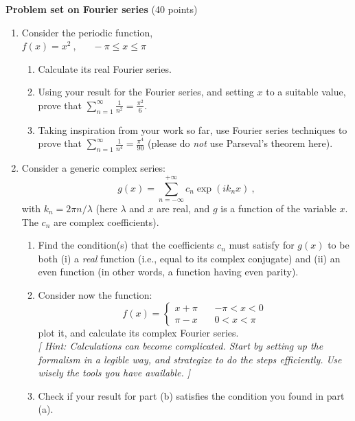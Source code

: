 \documentclass[fleqn]{article}
\begin{document}
\textbf{Problem set on Fourier series} (40 points)
\begin{enumerate}
  \item Consider the periodic function, \\$f(x)=x^2~,~~~~~~~ -\pi \leq x \leq \pi$
    \begin{enumerate}
    \item Calculate its real Fourier series.
    \item Using your result for the Fourier series, and setting $x$ to a suitable value, prove that $\sum^{\infty}_{n=1}\frac{1}{n^2}=\frac{\pi^2}{6}$. 
    \item Taking inspiration from your work so far, use Fourier series techniques to prove that $\sum^{\infty}_{n=1}\frac{1}{n^4}=\frac{\pi^4}{90}$ (please do \emph{not} use Parseval's theorem here). 

    \end{enumerate}

  \item Consider a generic complex series: $$g(x)=\sum_{n=-\infty}^{+ \infty} c_n \exp({ i k_n x})~,$$ with $k_n=2 \pi n/\lambda$ (here $\lambda$ and $x$ are real, and $g$ is a function of the variable $x$. The $c_n$ are complex coefficients).
      \begin{enumerate}
        \item Find the condition(s) that the coefficients $c_n$ must satisfy for $g(x)$ to be both (i)  a {\it real} function (i.e., equal to its complex conjugate) and (ii) an even function (in other words, a function having even parity).  
        \item Consider now the function:
        \begin{equation}
          f\left( x\right) =\left\{ 
          \begin{array}{rrr}
          x+ \pi  & \, & - \pi <x<0 \\ 
          \pi - x & \, & 0<x< \pi
          \end{array}
          \right. 
        \end{equation}
        plot it, and calculate its complex Fourier series.  \\
        {\it [ Hint: Calculations can become complicated. Start by setting up the formalism in a legible way, and strategize to do the steps efficiently. Use wisely the tools you have available.  ] }
      
        \item Check if your result for part (b) satisfies the condition you found in part (a).
      \end{enumerate}


\end{enumerate}
\end{document}
